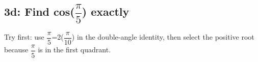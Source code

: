 \documentclass[11pt]{article}
\begin{document}
\begin{keepsection}
\begin{keepsection}
\end{keepsection}

\begin{keepsection}
\subsection{3d: Find cos({\small\ensuremath{\dfrac{π}{5}}}) exactly}

Try first: use {\small\ensuremath{\dfrac{π}{5}}}=2({\small\ensuremath{\dfrac{π}{10}}}) in the double-angle identity, then select the positive root because {\small\ensuremath{\dfrac{π}{5}}} is in the first quadrant.

\end{keepsection}
\end{keepsection}
\end{document}
